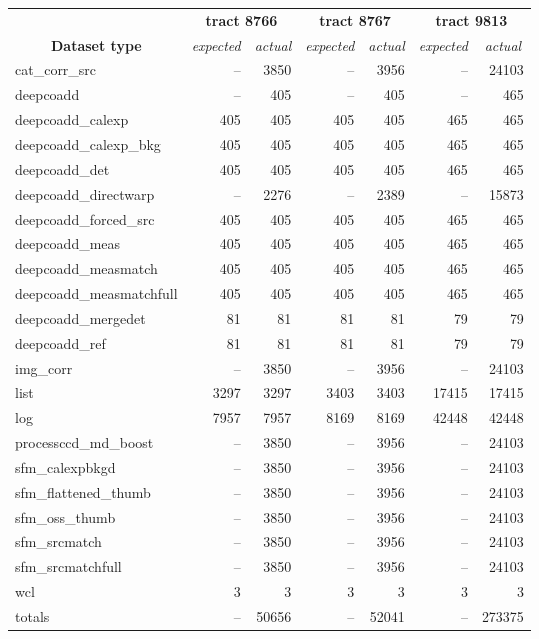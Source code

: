 \begin{table}[h]
	\caption{
		File counts. Expected values came from corresponding weekly RC
		exections. Symbol \dag{} dentoes dataset types which differs from
		weekly execution and \ddag{} indicates DESDM specific dataset types.
	}
	\label{tab:count}
	\small
	\begin{longtable}{lrrrrrr}
		\hline\hline
		                                          &
		\multicolumn{2}{c}{\textbf{tract 8766}}   &
		\multicolumn{2}{c}{\textbf{tract 8767}}   &
		\multicolumn{2}{c}{\textbf{tract 9813}}   \\
		\multicolumn{1}{c}{\textbf{Dataset type}} &
		\multicolumn{1}{c}{\textit{expected}}     &
		\multicolumn{1}{c}{\textit{actual}}       &
		\multicolumn{1}{c}{\textit{expected}}     &
		\multicolumn{1}{c}{\textit{actual}}       &
		\multicolumn{1}{c}{\textit{expected}}     &
		\multicolumn{1}{c}{\textit{actual}}       \\
		\hline\hline
		cat\_corr\_src\dag & -- & 3850 & -- & 3956 & -- & 24103 \\
		deepcoadd\dag & -- & 405 & -- & 405 & -- & 465 \\
		deepcoadd\_calexp & 405 & 405 & 405 & 405 & 465 & 465 \\
		deepcoadd\_calexp\_bkg & 405 & 405 & 405 & 405 & 465 & 465 \\
		deepcoadd\_det & 405 & 405 & 405 & 405 & 465 & 465 \\
		deepcoadd\_directwarp & --  & 2276 & -- & 2389 & -- & 15873 \\
		deepcoadd\_forced\_src & 405 & 405 & 405 & 405 & 465 & 465 \\
		deepcoadd\_meas & 405 & 405 & 405 & 405 & 465 & 465 \\
		deepcoadd\_measmatch & 405 & 405 & 405 & 405 & 465 & 465 \\
		deepcoadd\_measmatchfull & 405 & 405 & 405 & 405 & 465 & 465 \\
		deepcoadd\_mergedet & 81 & 81 & 81 & 81 & 79 & 79 \\
		deepcoadd\_ref & 81 & 81 & 81 & 81 & 79 & 79 \\
		img\_corr\dag & -- & 3850 & -- & 3956 & -- & 24103 \\
		list\ddag & 3297 & 3297 & 3403 & 3403 & 17415 & 17415 \\
		log\ddag & 7957 & 7957 & 8169 & 8169 & 42448 & 42448 \\
		processccd\_md\_boost & -- & 3850 & -- & 3956 & -- & 24103 \\
		sfm\_calexpbkgd & -- & 3850 & -- & 3956 & -- & 24103 \\
		sfm\_flattened\_thumb & -- & 3850 & -- & 3956 & -- & 24103 \\
		sfm\_oss\_thumb & -- & 3850 & -- & 3956 & -- & 24103 \\
		sfm\_srcmatch & -- & 3850 & -- & 3956 & -- & 24103 \\
		sfm\_srcmatchfull & -- & 3850 & -- & 3956 & -- & 24103 \\
		wcl\ddag & 3 & 3 & 3 & 3 & 3 & 3 \\
		\hline
		totals & -- & 50656 & -- & 52041 & -- & 273375 \\
		\hline\hline
	\end{longtable}
\end{table}
